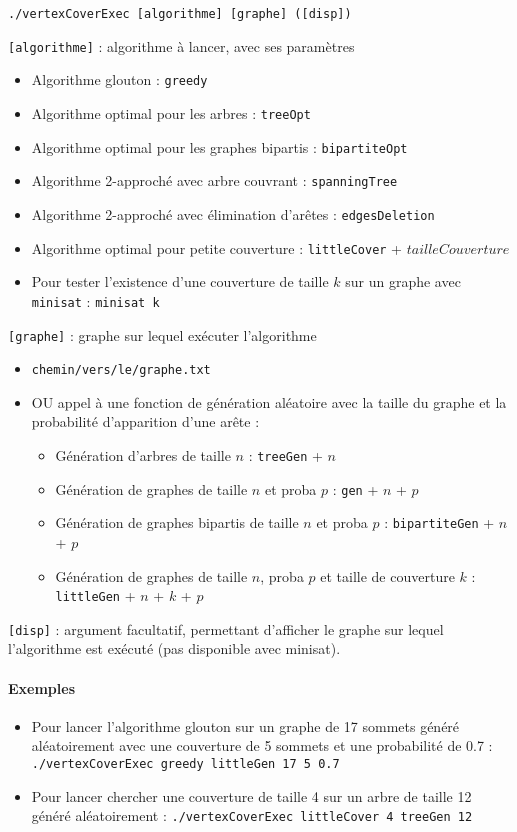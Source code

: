 \documentclass[a4paper,10pt]{article}
\newcommand*{\itemb}{\item[$\bullet$]}
\begin{document}
	\bigskip
	\texttt{./vertexCoverExec [algorithme] [graphe] ([disp])}

	\bigskip
	\texttt{[algorithme]} : algorithme à lancer, avec ses paramètres
	\begin{itemize}
		\item Algorithme glouton : \texttt{greedy}
		\item Algorithme optimal pour les arbres : \texttt{treeOpt}
		\item Algorithme optimal pour les graphes bipartis : \texttt{bipartiteOpt}
		\item Algorithme 2-approché avec arbre couvrant : \texttt{spanningTree}
		\item Algorithme 2-approché avec élimination d'arêtes : \texttt{edgesDeletion}
		\item Algorithme optimal pour petite couverture : \texttt{littleCover} + $tailleCouverture$
		\item Pour tester l'existence d'une couverture de taille $k$ sur un graphe avec \texttt{minisat} : \texttt{minisat k}
	\end{itemize}
	
	\bigskip
	\texttt{[graphe]} : graphe sur lequel exécuter l'algorithme
	\begin{itemize}
		\item \texttt{chemin/vers/le/graphe.txt}
		\item OU appel à une fonction de génération aléatoire avec la taille du graphe et la probabilité d'apparition d'une arête :
			\begin{itemize}
			\itemb Génération d'arbres de taille $n$ : \texttt{treeGen} + $n$
			\itemb Génération de graphes de taille $n$ et proba $p$ : \texttt{gen} + $n$ + $p$
			\itemb Génération de graphes bipartis de taille $n$ et proba $p$ : \texttt{bipartiteGen} + $n$ + $p$
			\itemb Génération de graphes de taille $n$, proba $p$ et taille de couverture $k$ : \texttt{littleGen} + $n$ + $k$ + $p$
			
			\end{itemize}
	\end{itemize}
	
	\bigskip
	\texttt{[disp]} : argument facultatif, permettant d'afficher le graphe sur lequel l'algorithme est exécuté (pas disponible avec minisat).
	
	\paragraph{Exemples}
	\begin{itemize}
	\item Pour lancer l'algorithme glouton sur un graphe de 17 sommets généré aléatoirement avec une couverture de 5 sommets et une probabilité de 0.7 :
	\texttt{./vertexCoverExec greedy littleGen 17 5 0.7}
	
	\item Pour lancer chercher une couverture de taille 4 sur un arbre de taille 12 généré aléatoirement :
	\texttt{./vertexCoverExec littleCover 4 treeGen 12}
	\end{itemize}
	
\end{document}
